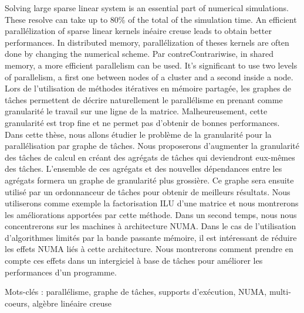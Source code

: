 Solving large sparse linear system is an essential part of numerical simulations. These resolve can take up to 80\% of the total of the simulation time.
An efficient parallélization of sparse linear kernels inéaire creuse leads to obtain better performances. In distributed memory, parallélization of theses kernels are often done by changing the numerical scheme. Par contreContrariwise, in shared memory, a more efficient parallelism can be used. It's significant to use two levels of parallelism, a first one between nodes of a cluster and a second inside a node. Lors de l'utilisation de méthodes itératives en mémoire partagée, les graphes de tâches permettent de décrire naturellement le parallélisme en prenant comme granularité le travail sur une ligne de la matrice. Malheureusement, cette granularité est trop fine et ne permet pas d'obtenir de bonnes performances.
Dans cette thèse, nous allons étudier le problème de la granularité pour la parallélisation par graphe de tâches. Nous proposerons d'augmenter la granularité des tâches de calcul en créant des agrégats de tâches qui deviendront eux-mêmes des tâches. L'ensemble de ces agrégats et des nouvelles dépendances entre les agrégats formera un graphe de granularité plus grossière. Ce graphe sera ensuite utilisé par un ordonnanceur de tâches pour obtenir de meilleurs résultats. Nous utiliserons comme exemple la factorisation ILU d'une matrice et nous montrerons les améliorations apportées par cette méthode. Dans un second temps, nous nous concentrerons sur les machines à architecture NUMA. Dans le cas de l'utilisation d'algorithmes limités par la bande passante mémoire, il est intéressant de réduire les effets NUMA liés à cette architecture. Nous montrerons comment prendre en compte ces effets dans un intergiciel à base de tâches pour améliorer les performances d'un programme.

Mots-clés : parallélisme, graphe de tâches, supports d’exécution, NUMA, multi-coeurs, algèbre linéaire creuse
